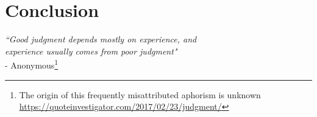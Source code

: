 
\chapter{Conclusion}
\label{chap:conclusion}
\begin{flushright}
\singlespacing
\emph{``Good judgment depends mostly on experience, and\\ experience usually comes from poor judgment"} \\- Anonymous\footnote{The origin of this frequently misattributed aphorism is unknown \url{https://quoteinvestigator.com/2017/02/23/judgment/}}
\end{flushright}
\onehalfspacing
\vspace{1cm}



	 


